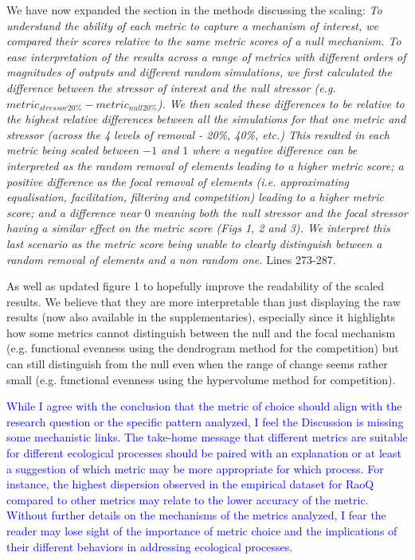 \documentclass[
]{article}
\begin{document}
We have now expanded the section in the methods discussing the scaling:
 \textit{To understand the ability of each metric to capture a mechanism of interest, we compared their scores relative to the same metric scores of a null mechanism.
To ease interpretation of the results across a range of metrics with different orders of magnitudes of outputs and different random simulations, we first calculated the difference between the stressor of interest and the null stressor (e.g. $metric_{stressor20\%} - metric_{null20\%}$).
We then scaled these differences to be relative to the highest relative differences between all the simulations for that one metric and stressor (across the 4 levels of removal - 20\%, 40\%, etc.)
This resulted in each metric being scaled between $-1$ and $1$ where a negative difference can be interpreted as the random removal of elements leading to a higher metric score; a positive difference as the focal removal of elements (i.e. approximating equalisation, facilitation, filtering and competition) leading to a higher metric score; and a difference near $0$ meaning both the null stressor and the focal stressor having a similar effect on the metric score (Figs 1, 2 and 3).
We interpret this last scenario as the metric score being unable to clearly distinguish between a random removal of elements and a non random one.}
Lines 273-287.

As well as updated figure 1 to hopefully improve the readability of the scaled results.
We believe that they are more interpretable than just displaying the raw results (now also available in the supplementaries), especially since it highlights how some metrics cannot distinguish between the null and the focal mechanism (e.g. functional evenness using the dendrogram method for the competition) but can still distinguish from the null even when the range of change seems rather small (e.g. functional evenness using the hypervolume method for competition).

\textcolor{blue}{While I agree with the conclusion that the metric of choice should align with the research question or the specific pattern analyzed, I feel the Discussion is missing some mechanistic links.
The take-home message that different metrics are suitable for different ecological processes should be paired with an explanation or at least a suggestion of which metric may be more appropriate for which process.
For instance, the highest dispersion observed in the empirical dataset for RaoQ compared to other metrics may relate to the lower accuracy of the metric.
Without further details on the mechanisms of the metrics analyzed, I fear the reader may lose sight of the importance of metric choice and the implications of their different behaviors in addressing ecological processes.}
\end{document}
